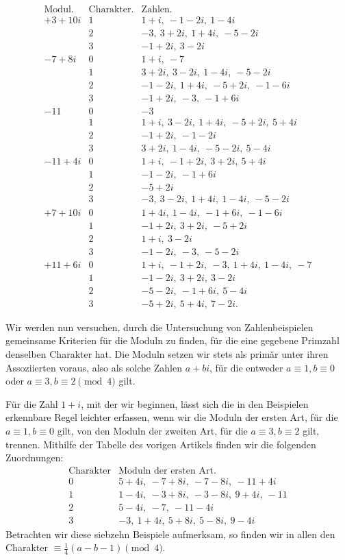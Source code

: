 %
\[
\begin{array}{r|c|l}
\text{Modul.}&\text{Charakter.}&\text{Zahlen.}\\\hline
+3+10i&1&1+i,\ -1-2i,\ 1-4i\\
&2&-3,\ 3+2i,\ 1+4i,\ -5-2i\\
&3&-1+2i,\ 3-2i\\
-7+8i&0&1+i,\ -7\\
&1&3+2i,\ 3-2i,\ 1-4i,\ -5-2i\\
&2&-1-2i,\ 1+4i,\ -5+2i,\ -1-6i\\
&3&-1+2i,\ -3,\ -1+6i\\
-11&0&-3\\
&1&1+i,\ 3-2i,\ 1+4i,\ -5+2i,\ 5+4i\\
&2&-1+2i,\ -1-2i\\
&3&3+2i,\ 1-4i,\ -5-2i,\ 5-4i\\
-11+4i&0&1+i,\ -1+2i,\ 3+2i,\ 5+4i\\
&1&-1-2i,\ -1+6i\\
&2&-5+2i\\
&3&-3,\ 3-2i,\ 1+4i,\ 1-4i,\ -5-2i\\
+7+10i&0&1+4i,\ 1-4i,\ -1+6i,\ -1-6i\\
&1&-1+2i,\ 3+2i,\ -5+2i\\
&2&1+i,\ 3-2i\\
&3&-1-2i,\ -3,\ -5-2i\\
+11+6i&0&1+i,\ -1+2i,\ -3,\ 1+4i,\ 1-4i,\ -7\\
&1&-1-2i,\ 3+2i,\ 3-2i\\
&2&-5-2i,\ -1+6i,\ 5-4i\\
&3&-5+2i,\ 5+4i,\ 7-2i.
\end{array}
\]

Wir werden nun versuchen, durch die Untersuchung von Zahlenbeispielen gemeinsame Kriterien für die Moduln zu finden, für die eine gegebene Primzahl denselben Charakter hat. Die Moduln setzen wir stets als primär unter ihren Assoziierten voraus, also als solche Zahlen $a+bi$, für die entweder $a\equiv1,b\equiv0$ oder $a\equiv3,b\equiv2\pmod4$ gilt.

Für die Zahl $1+i$, mit der wir beginnen, lässt sich die in den Beispielen erkennbare Regel leichter erfassen, wenn wir die Moduln der ersten Art, für die $a\equiv1,b\equiv0$ gilt, von den Moduln der zweiten Art, für die $a\equiv3,b\equiv2$ gilt, trennen. Mithilfe der Tabelle des vorigen Artikels finden wir die folgenden Zuordnungen:
%
\[
\begin{array}{c|l}
\text{Charakter}&\text{Moduln der ersten Art.}\\\hline
0&5+4i,\ -7+8i,\ -7-8i,\ -11+4i\\
1&1-4i,\ -3+8i,\ -3-8i,\ 9+4i,\ -11\\
2&5-4i,\ -7,\ -11-4i\\
3&-3,\ 1+4i,\ 5+8i,\ 5-8i,\ 9-4i
\end{array}
\]
Betrachten wir diese siebzehn Beispiele aufmerksam, so finden wir in allen den Charakter $\equiv\frac14(a-b-1)\pmod4$.


